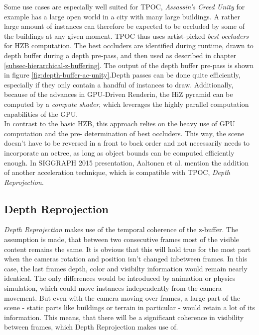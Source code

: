 \noindent
Some use cases are especially well suited for \ac{TPOC}, \emph{Assassin's Creed Unity} for example has a large open 
world in a city with many large buildings. A rather large amount of instances can therefore be expected to be occluded 
by some of the buildings at any given moment. \ac{TPOC} thus uses artist-picked \emph{best occluders} for \ac{HZB} 
computation. The best occluders are identified during runtime, drawn to depth buffer during a depth pre-pass, and 
then used as described in chapter \ref{subsec-hierarchical-z-buffering}. The output of the depth buffer pre-pass is 
shown in figure \ref{fig:depth-buffer-ac-unity}.Depth passes can be done quite efficiently, especially if they 
only contain a handful of instances to draw. Additionally, because of the advances in \ac{GPU}-Driven Renderin, the 
\ac{HiZ} pyramid can be computed by a \emph{compute shader}, which leverages the highly parallel computation 
capabilities of the \ac{GPU}. \\

\noindent
In contrast to the basic \ac{HZB}, this approach relies on the heavy use of \ac{GPU} computation and the pre-
determination of best occluders. This way, the scene doesn't have to be reversed in a front to back order and 
not necessarily needs to incorporate an octree, as long as object bounds can be computed efficiently enough.
In SIGGRAPH 2015 presentation, Aaltonen et al. mention the addition of another acceleration technique, which 
is compatible with \ac{TPOC}, \emph{Depth Reprojection}. 


\subsection{Depth Reprojection} \label{subsec-depth-reprojection}

\emph{Depth Reprojection} makes use of the temporal coherence of the z-buffer. The assumption is made, that 
between two consecutive frames most of the visible content remains the same. It is obvious that this will 
hold true for the most part when the cameras rotation and position isn't changed inbetween frames. In this case, 
the last frames depth, color and visibilty information would remain nearly identical. The only differences would 
be introduced by animation or physics simulation, which could move instances independently from the camera movement.
But even with the camera moving over frames, a large part of the scene - static parts like buildings or terrain in 
particular - would retain a lot of its information. This means, that there will be a significant coherence in 
visibility between frames, which Depth Reprojection makes use of.\\

